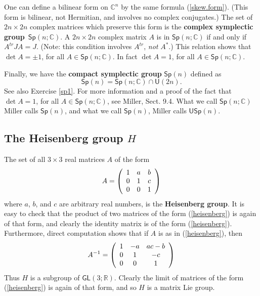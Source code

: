 \documentclass[12pt]{amsbook}
\theoremstyle{plain}
\numberwithin{equation}{chapter}
\numberwithin{theorem}{chapter}
\begin{document}
One can define a bilinear form on $\mathbb{C}^{n}$ by the same formula
(\ref{skew.form}). (This form is bilinear, not Hermitian, and involves no
complex conjugates.) The set of $2n\times2n$ complex matrices which preserve
this form is the \textbf{complex symplectic group}\emph{\ }$\mathsf{Sp}%
(n;\mathbb{C})$. A $2n\times2n$ complex matrix $A$ is in $\mathsf{Sp}%
(n;\mathbb{C})$ if and only if $A^{tr}JA=J$. (Note: this condition involves
$A^{tr}$, \textit{not} $A^{\ast}$.) This relation shows that $\det A=\pm1$,
for all $A\in\mathsf{Sp}(n;\mathbb{C})$. In fact $\det A=1$, for all
$A\in\mathsf{Sp}(n;\mathbb{C})$.

Finally, we have the \textbf{compact symplectic group} $\mathsf{Sp}(n)$
defined as
\[
\mathsf{Sp}(n)=\mathsf{Sp}\left(  n;\mathbb{C}\right)  \cap\mathsf{U}(2n).
\]
See also Exercise \ref{sp1}. For more information and a proof of the fact that
$\det A=1$, for all $A\in\mathsf{Sp}(n;\mathbb{C})$, see Miller, Sect. 9.4.
What we call $\mathsf{Sp}\left(  n;\mathbb{C}\right)  $ Miller calls
$\mathsf{Sp}(n)$, and what we call $\mathsf{Sp}(n)$, Miller calls
$\mathsf{USp}(n)$.

\subsection{The Heisenberg group $H$}

The set of all $3\times3$ real matrices $A$ of the form
\begin{equation}
A=\left(
\begin{array}
[c]{ccc}%
1 & a & b\\
0 & 1 & c\\
0 & 0 & 1
\end{array}
\right) \label{heisenberg}%
\end{equation}
where $a$, $b$, and $c$ are arbitrary real numbers, is the \textbf{Heisenberg
group}. It is easy to check that the product of two matrices of the form
(\ref{heisenberg}) is again of that form, and clearly the identity matrix is
of the form (\ref{heisenberg}). Furthermore, direct computation shows that if
$A$ is as in (\ref{heisenberg}), then
\[
A^{-1}=\left(
\begin{array}
[c]{ccc}%
1 & -a & ac-b\\
0 & 1 & -c\\
0 & 0 & 1
\end{array}
\right)
\]
Thus $H$ is a subgroup of $\mathsf{GL}(3;\mathbb{R})$. Clearly the limit of
matrices of the form (\ref{heisenberg}) is again of that form, and so $H$ is a
matrix Lie group.
\end{document}
